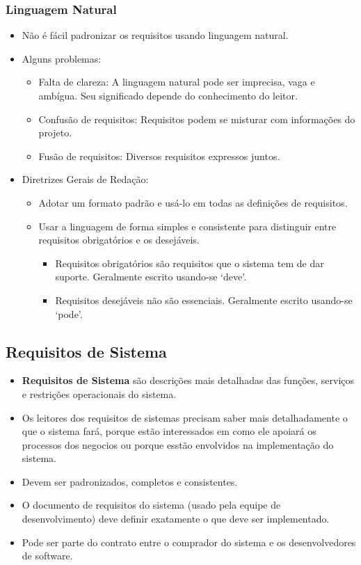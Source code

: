 \documentclass[a4paper, 11pt]{article}
\begin{document}
\subsubsection{Linguagem Natural}
\begin{itemize}
    \item Não é fácil padronizar os requisitos usando linguagem natural.
    \item Alguns problemas:
    \begin{itemize}
        \item Falta de clareza: A linguagem natural pode ser imprecisa, vaga e ambígua. Seu significado depende do conhecimento do leitor.
        \item Confusão de requisitos: Requisitos podem se misturar com informações do projeto.
        \item Fusão de requisitos: Diversos requisitos expressos juntos.
    \end{itemize}
    \item Diretrizes Gerais de Redação:
    \begin{itemize}
        \item Adotar um formato padrão e usá-lo em todas as definições de requisitos.
        \item Usar a linguagem de forma simples e consistente para distinguir entre requisitos obrigatórios e os desejáveis.
        \begin{itemize}
            \item Requisitos obrigatórios são requisitos que o sistema tem de dar suporte. Geralmente escrito usando-se `deve'.
            \item Requisitos desejáveis não são essenciais. Geralmente escrito usando-se `pode'.
        \end{itemize}
    \end{itemize}
\end{itemize}

\subsection{Requisitos de Sistema}
\begin{itemize}
    \item \textbf{Requisitos de Sistema} são descrições mais detalhadas das funções, serviços e restrições operacionais do sistema.
    \item Os leitores dos requisitos de sistemas precisam saber mais detalhadamente o que o sistema fará, porque estão interessados em como ele apoiará
    os processos dos negocios ou porque esstão envolvidos na implementação do sistema.
    \item Devem ser padronizados, completos e consistentes. 
    \item O documento de requisitos do sistema (usado pela equipe de desenvolvimento) deve definir exatamente o que deve ser implementado. 
    \item Pode ser parte do contrato entre o comprador do sistema e os desenvolvedores de software.
\end{itemize}
\end{document}
